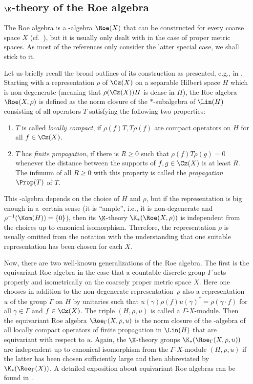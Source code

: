 \subsection[K-theory of the Roe algebra]{$\boldsymbol{\K}$-theory of the Roe algebra}\label{sec:RoeAlg}

The Roe algebra is a \textCstar-algebra $\Roe(X)$ that can be constructed for every coarse space $X$ (cf.\ \cite[Section~4.4]{RoeCoarseGeometry}), but it is usually only dealt with in the case of proper metric spaces. As most of the references only consider the latter special case, we shall stick to it.

Let us briefly recall the broad outlines of its construction as presented, e.g., in \cite[Section~6.3]{HigRoe}. Starting with a representation $\rho$ of $\Cz(X)$ on a separable Hilbert space $H$ which is non-degenerate (meaning that $\rho(\Cz(X))H$ is dense in $H$), the Roe algebra $\Roe(X,\rho)$ is defined as the norm closure of the $*$-subalgebra of $\Lin(H)$ consisting of all operators $T$ satisfying the following two properties:
\begin{enumerate}\itemsep=0pt
\item[$\bullet$] $T$ is called \emph{locally compact}, if $\rho(f)T,T\rho(f)$ are compact operators on $H$ for all $f\in\Cz(X)$.
\item[$\bullet$] $T$ has \emph{finite propagation}, if there is $R\geq 0$ such that $\rho(f)T\rho(g)=0$ whenever the distance between the supports of $f,g\in\Cz(X)$ is at least $R$. The infimum of all $R\geq 0$ with this property is called the \emph{propagation} $\Prop(T)$ of $T$.
\end{enumerate}
This \textCstar-algebra depends on the choice of $H$ and $\rho$, but if the representation is big enough in a~cer\-tain sense (it is \enquote{ample}, i.e., it is non-degenerate and $\rho^{-1}(\Kom(H))=\{0\}$), then its $\K$-theory $\K_*(\Roe(X,\rho))$ is independent from the choices up to canonical isomorphism.
Therefore, the representation $\rho$ is usually omitted from the notation with the understanding that one suitable representation has been chosen for each $X$.

Now, there are two well-known generalizations of the Roe algebra. The first is the equivariant Roe algebra in the case that a countable discrete group $\Gamma$ acts properly and isometrically on the coarsely proper metric space $X$. Here one chooses in addition to the non-degenerate representation~$\rho$ also a representation $u$ of the group $\Gamma$ on $H$ by unitaries such that $u(\gamma)\rho(f)u(\gamma)^*=\rho(\gamma\cdot f)$ for all $\gamma\in\Gamma$ and $f\in\Cz(X)$. The triple $(H,\rho,u)$ is called a $\Gamma$-$X$-module. Then the equivariant Roe algebra $\Roe_\Gamma(X,\rho,u)$ is the norm closure of the \textCstar-algebra of all locally compact operators of finite propagation in $\Lin(H)$ that are equivariant with respect to $u$. Again, the $\K$-theory groups $\K_*(\Roe_\Gamma(X,\rho,u))$ are independent up to canonical isomorphism from the $\Gamma$-$X$-module $(H,\rho,u)$ if the latter has been chosen sufficiently large and then abbreviated by $\K_*(\Roe_\Gamma(X))$.
A detailed exposition about equivariant Roe algebras can be found in \cite{WillettYuHigherIndexTheory}.

